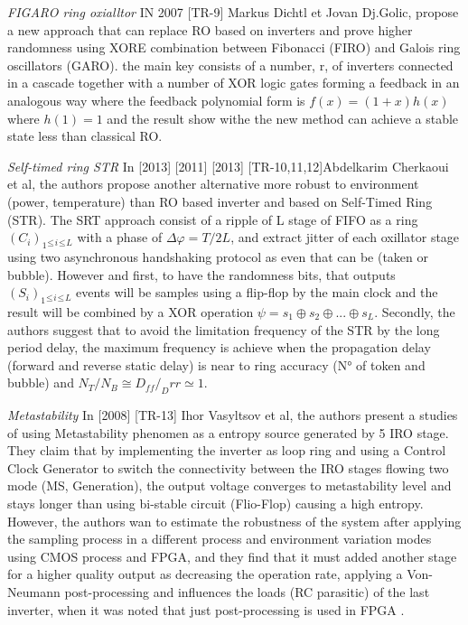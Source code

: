\textit{FIGARO ring oxialltor} IN 2007 [TR-9] Markus Dichtl et Jovan Dj.Golic, propose a new approach that can replace RO based on inverters and prove higher randomness using XORE combination between Fibonacci (FIRO) and Galois ring oscillators (GARO). the main key consists of a number, r, of inverters connected in a cascade together with a number of XOR logic gates forming a feedback in an analogous way where the feedback polynomial form is $f(x) = (1+x)h(x)$ where $h(1)=1$ and the result show withe the new method can achieve a stable state less than classical RO. 

\textit{Self-timed ring STR} In [2013] [2011] [2013] [TR-10,11,12]Abdelkarim Cherkaoui et al, the authors propose another alternative more robust to environment (power, temperature) than RO based inverter and based on Self-Timed Ring (STR). The SRT approach consist of a ripple of L stage of FIFO as a ring $(C_{i})_{1}{_{\leq}}{_{i}}{_{\leq}}{_{L}}$ with a phase of $\Delta \varphi = T/2L$, and extract jitter of each oxillator stage using two asynchronous handshaking protocol as even that can be (taken or bubble). However and first, to have the randomness bits, that outputs $(S_{i})_{1}{_{\leq}}{_{i}}{_{\leq}}{_{L}}$ events will be samples using a flip-flop by the main clock and the result will be combined by a XOR operation $\psi = s_{1} \oplus s_{2} \oplus ... \oplus s_{L}$. Secondly, the authors suggest that to avoid the limitation frequency of the STR by the long period delay, the maximum frequency is achieve when the propagation delay (forward and reverse static delay) is near to ring accuracy (N° of token and bubble) and $N_{T}/N_{B} \cong D_{ff}/_D{rr} \simeq 1$.

\textit{Metastability} In [2008] [TR-13] Ihor Vasyltsov et al, the authors present a studies of using Metastability phenomen as a entropy source generated by 5 IRO stage. They claim that by implementing the inverter as loop ring and using a Control Clock Generator to switch the connectivity between the IRO stages flowing two mode (MS, Generation), the output voltage converges to metastability level and stays longer than using bi-stable circuit (Flio-Flop) causing a high entropy. However, the authors wan to estimate the robustness of the system after applying the sampling process in a different process and environment variation modes using CMOS process and FPGA, and they find that it must added another stage for a higher quality output as decreasing the operation rate, applying a Von-Neumann post-processing and influences the loads (RC parasitic) of the last inverter, when it was noted that just post-processing is used in FPGA .

